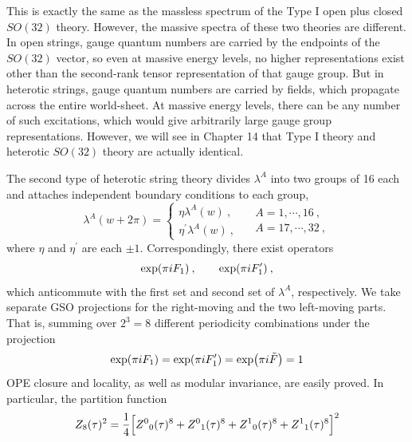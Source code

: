 This is exactly the same as the massless spectrum of the Type I open plus closed $SO(32)$ theory. However, the massive spectra of these two theories are different. In open strings, gauge quantum numbers are carried by the endpoints of the $SO(32)$ vector, so even at massive energy levels, no higher representations exist other than the second-rank tensor representation of that gauge group. But in heterotic strings, gauge quantum numbers are carried by fields, which propagate across the entire world-sheet. At massive energy levels, there can be any number of such excitations, which would give arbitrarily large gauge group representations. However, we will see in Chapter 14 that Type I theory and heterotic $SO(32)$ theory are actually identical.

The second type of heterotic string theory divides $\lambda^{A}$ into two groups of 16 each and attaches independent boundary conditions to each group,
\begin{equation}
	\lambda^{A}(w+2\pi) = \left\{
	\begin{array}{l}
		\eta \lambda^{A}(w) \: ,\\
		\eta^{\prime} \lambda^{A}(w) \:, 
	\end{array} \quad 
	\begin{array}{l}
		A=1,\cdots,16\:,  \\
		A=17,\cdots,32 \:, 
	\end{array}
	\right. \label{11.2.19}
\end{equation}
where $\eta$ and $\eta^{\prime}$ are each $\pm1$. Correspondingly, there exist operators
\begin{equation}
	\exp(\pi i F_{1}) \:, \qquad \exp(\pi i F_{1}^{\prime}) \:, \label{11.2.20} 
\end{equation}
which anticommute with the first set and second set of $\lambda^{A}$, respectively. We take separate GSO projections for the right-moving and the two left-moving parts. That is, summing over $2^{3}=8$ different periodicity combinations under the projection
\begin{equation}
	\exp(\pi i F_{1}) =\exp (\pi i F_{1}^{\prime}) =\exp(\pi i \tilde{F}) = 1  \label{11.2.21}
\end{equation}
OPE closure and locality, as well as modular invariance, are easily proved. In particular, the partition function
\begin{equation}
	Z_{8}(\tau)^{2} = \frac{1}{4} \Bigl[Z^{0}{}_{0}(\tau)^{8} + Z^{0}{}_{1}(\tau)^{8}
	+Z^{1}{}_{0}(\tau)^{8} + Z^{1}{}_{1}(\tau)^{8} \Bigr]^{2} \label{11.2.22}
\end{equation}
